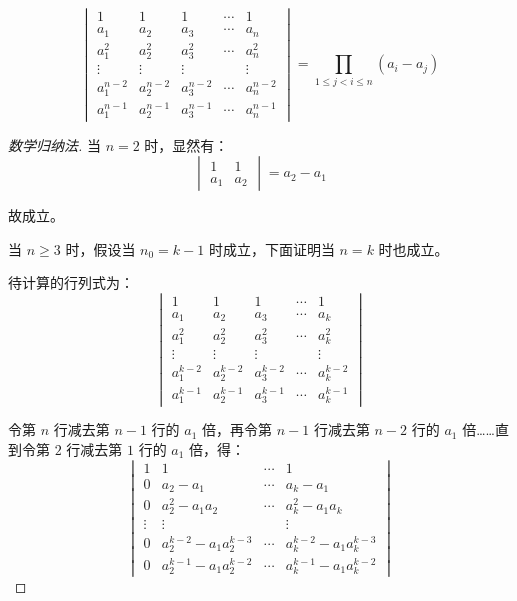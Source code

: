 \begin{theorem}[范德蒙德行列式的值]
	$$
	\begin{vmatrix}
		1 & 1 & 1 & \cdots & 1
		\\
		a_1 & a_2 & a_3 & \cdots & a_n
		\\
		a_1^2 & a_2^2 & a_3^2 & \cdots & a_n^2
		\\
		\vdots & \vdots & \vdots & & \vdots
		\\
		a_1^{n - 2} & a_2^{n - 2} & a_3^{n - 2} & \cdots & a_n^{n - 2}
		\\
		a_1^{n - 1} & a_2^{n - 1} & a_3^{n - 1} & \cdots & a_n^{n - 1}
	\end{vmatrix}
	=
	\prod\limits_{1 \le j < i \le n} (a_i - a_j)
	$$
\end{theorem}

\begin{proof}[数学归纳法]
	当 $n = 2$ 时，显然有：
	$$
	\begin{vmatrix}
		1 & 1
		\\
		a_1 & a_2
	\end{vmatrix}
	= a_2 - a_1
	$$

	故成立。

	\bigskip

	当 $n \ge 3$ 时，假设当 $n_0 = k - 1$ 时成立，下面证明当 $n = k$ 时也成立。

	待计算的行列式为：
	$$
	\begin{vmatrix}
		1 & 1 & 1 & \cdots & 1
		\\
		a_1 & a_2 & a_3 & \cdots & a_k
		\\
		a_1^2 & a_2^2 & a_3^2 & \cdots & a_k^2
		\\
		\vdots & \vdots & \vdots & & \vdots
		\\
		a_1^{k - 2} & a_2^{k - 2} & a_3^{k - 2} & \cdots & a_k^{k - 2}
		\\
		a_1^{k - 1} & a_2^{k - 1} & a_3^{k - 1} & \cdots & a_k^{k - 1}
	\end{vmatrix}
	$$

	令第 $n$ 行减去第 $n - 1$ 行的 $a_1$ 倍，再令第 $n - 1$ 行减去第 $n - 2$ 行的 $a_1$ 倍……直到令第 $2$ 行减去第 $1$ 行的 $a_1$ 倍，得：
	$$
	\begin{vmatrix}
		1 & 1 & \cdots & 1
		\\
		0 & a_2 - a_1 & \cdots & a_k - a_1
		\\
		0 & a_2^2 - a_1 a_2 & \cdots & a_k^2 - a_1 a_k
		\\
		\vdots & \vdots & & \vdots
		\\
		0 & a_2^{k - 2} - a_1 a_2^{k - 3} & \cdots & a_k^{k - 2} - a_1 a_k^{k - 3}
		\\
		0 & a_2^{k - 1} - a_1 a_2^{k - 2} & \cdots & a_k^{k - 1} - a_1 a_k^{k - 2}
	\end{vmatrix}
	$$


\end{proof}
